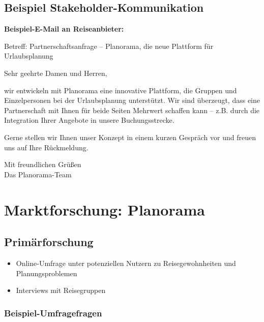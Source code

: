 \documentclass{article}
\begin{document}
\subsection{Beispiel
Stakeholder-Kommunikation}\label{beispiel-stakeholder-kommunikation}

\textbf{Beispiel-E-Mail an Reiseanbieter:}

Betreff: Partnerschaftsanfrage -- Planorama, die neue Plattform für
Urlaubsplanung

Sehr geehrte Damen und Herren,

wir entwickeln mit Planorama eine innovative Plattform, die Gruppen und
Einzelpersonen bei der Urlaubsplanung unterstützt. Wir sind überzeugt,
dass eine Partnerschaft mit Ihnen für beide Seiten Mehrwert schaffen
kann -- z.B. durch die Integration Ihrer Angebote in unsere
Buchungsstrecke.

Gerne stellen wir Ihnen unser Konzept in einem kurzen Gespräch vor und
freuen uns auf Ihre Rückmeldung.

Mit freundlichen Grüßen\\
Das Planorama-Team

\newpage

\section{Marktforschung: Planorama}\label{marktforschung-planorama}

\subsection{Primärforschung}\label{primuxe4rforschung}

\begin{itemize}
\tightlist
\item
  Online-Umfrage unter potenziellen Nutzern zu Reisegewohnheiten und
  Planungsproblemen
\item
  Interviews mit Reisegruppen
\end{itemize}

\subsubsection{Beispiel-Umfragefragen}\label{beispiel-umfragefragen}
\end{document}
